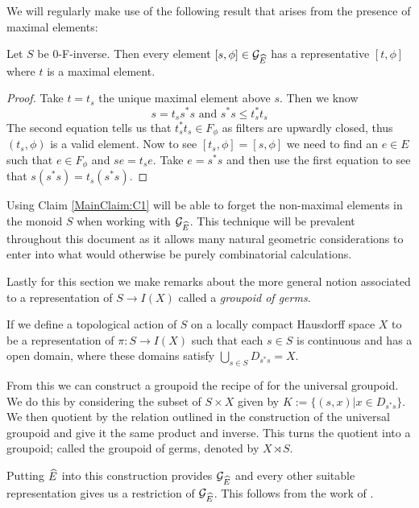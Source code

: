 \begin{example}
We will regularly make use of the following result that arises from the presence of maximal elements:

\begin{claim}\label{MainClaim:C1}
Let $S$ be 0-F-inverse. Then every element $[s,\phi] \in \mathcal{G}_{\widehat{E}}$ has a representative $[t,\phi]$ where $t$ is a maximal element.
\end{claim}
\begin{proof}
Take $t=t_{s}$ the unique maximal element above $s$. Then we know 
\begin{equation*}
s = t_{s}s^{*}s \mbox{ and } s^{*}s \leq t_{s}^{*}t_{s}
\end{equation*} 
The second equation tells us that $t_{s}^{*}t_{s} \in F_{\phi}$ as filters are upwardly closed, thus $(t_{s},\phi)$ is a valid element. Now to see $[t_{s},\phi]=[s,\phi]$ we need to find an $e \in E$ such that $e \in F_{\phi}$ and $se=t_{s}e$. Take $e=s^{*}s$ and then use the first equation to see that $s(s^{*}s)=t_{s}(s^{*}s)$.
\end{proof}
Using Claim \ref{MainClaim:C1} will be able to forget the non-maximal elements in the monoid $S$ when working with $\mathcal{G}_{\widehat{E}}$. This technique will be prevalent throughout this document as it allows many natural geometric considerations to enter into what would otherwise be purely combinatorial calculations.

Lastly for this section we make remarks about the more general notion associated to a representation of $S \rightarrow I(X)$ called a \textit{groupoid of germs}.

\begin{remark}
If we define a topological action of $S$ on a locally compact Hausdorff space $X$ to be a representation of $\pi:S \rightarrow I(X)$ such that each $s \in S$ is continuous and has a open domain, where these domains satisfy $\bigcup_{s \in S}D_{s^{*}s} = X$.

From this we can construct a groupoid the recipe of for the universal groupoid. We do this by considering the subset of $S \times X$ given by $K:=\lbrace (s,x) | x \in D_{s^{*}s}\rbrace$. We then quotient by the relation outlined in the construction of the universal groupoid and give it the same product and inverse. This turns the quotient into a groupoid; called the groupoid of germs, denoted by $X \rtimes S$.

Putting $\widehat{E}$ into this construction provides $\mathcal{G}_{\widehat{E}}$ and every other suitable representation gives us a restriction of $\mathcal{G}_{\widehat{E}}$. This follows from the work of \cite{MR2419901}.
 

\end{remark}
\end{example}
